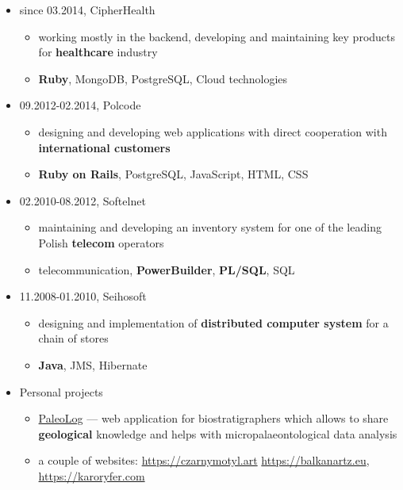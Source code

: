 \documentclass[a4paper]{article}
\begin{document}
\begin{itemize}
  \item
  since 03.2014,
  CipherHealth
  \begin{itemize}
    \item
      working mostly in the backend, developing and maintaining key products for \textbf{healthcare} industry
    \item
      \textbf{Ruby}, MongoDB, PostgreSQL, Cloud technologies
  \end{itemize}
  \item
    09.2012-02.2014,
    Polcode
    \begin{itemize}
      \item
        designing and developing web applications with direct cooperation with \textbf{international customers}
      \item
        \textbf{Ruby on Rails}, PostgreSQL, JavaScript, HTML, CSS
    \end{itemize}
  \item
    02.2010-08.2012,
    Softelnet
    \begin{itemize}
      \item
        maintaining and developing an inventory system
        for one of the leading Polish \textbf{telecom} operators
      \item
        telecommunication, \textbf{PowerBuilder}, \textbf{PL/SQL}, SQL
    \end{itemize}
  \item
    11.2008-01.2010,
    Seihosoft
    \begin{itemize}
      \item
        designing and implementation of \textbf{distributed computer system}
        for a chain of stores
      \item
        \textbf{Java}, JMS, Hibernate
    \end{itemize}
  \item
    Personal projects
    \begin{itemize}
      \item
        \href{https://github.com/mradmacher/paleolog}{PaleoLog} --- web application for biostratigraphers which allows
        to share \textbf{geological} knowledge and helps with micropalaeontological data analysis
      \item
        a couple of websites: \href{https://czarnymotyl.art}{https://czarnymotyl.art} \href{https://balkanartz.eu}{https://balkanartz.eu}, \href{https://karoryfer.com}{https://karoryfer.com}
    \end{itemize}
\end{itemize}
\end{document}
